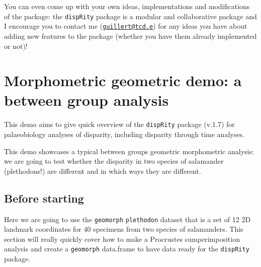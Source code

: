 \documentclass[
]{book}
\newenvironment{Shaded}{\begin{snugshade}}{\end{snugshade}}
\newcommand{\CommentTok}[1]{\textcolor[rgb]{0.56,0.35,0.01}{\textit{#1}}}
\newcommand{\KeywordTok}[1]{\textcolor[rgb]{0.13,0.29,0.53}{\textbf{#1}}}
\newcommand{\NormalTok}[1]{#1}
\newcommand{\OperatorTok}[1]{\textcolor[rgb]{0.81,0.36,0.00}{\textbf{#1}}}
\newcommand{\StringTok}[1]{\textcolor[rgb]{0.31,0.60,0.02}{#1}}
\begin{document}
You can even come up with your own ideas, implementations and modifications of the package: the \texttt{dispRity} package is a modular and collaborative package and I encourage you to contact me (\href{mailto:guillert@tcd.e}{\nolinkurl{guillert@tcd.e}}) for any ideas you have about adding new features to the package (whether you have them already implemented or not)!

\hypertarget{morphometric-geometric-demo-a-between-group-analysis}{%
\chapter{Morphometric geometric demo: a between group analysis}\label{morphometric-geometric-demo-a-between-group-analysis}}

This demo aims to give quick overview of the \texttt{dispRity} package (v.1.7) for palaeobiology analyses of disparity, including disparity through time analyses.

This demo showcases a typical between groups geometric morphometric analysis: we are going to test whether the disparity in two species of salamander (plethodons!) are different and in which ways they are different.

\hypertarget{before-starting-1}{%
\section{Before starting}\label{before-starting-1}}

Here we are going to use the \texttt{geomorph} \texttt{plethodon} dataset that is a set of 12 2D landmark coordinates for 40 specimens from two species of salamanders.
This section will really quickly cover how to make a Procrustes sumperimposition analysis and create a \texttt{geomorph} data.frame to have data ready for the \texttt{dispRity} package.

\begin{Shaded}
\end{Shaded}
\end{document}
